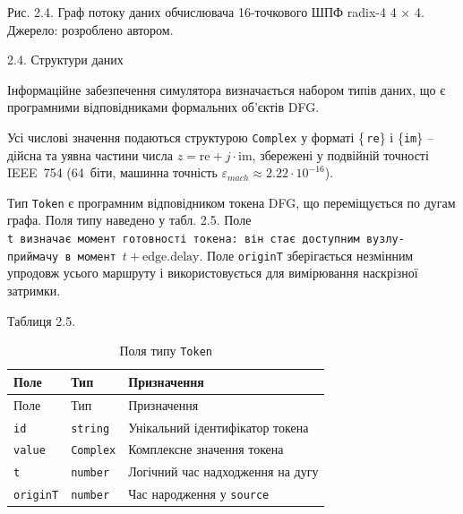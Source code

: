 \documentclass[
]{article}
\begin{document}
Рис. 2.4. Граф потоку даних обчислювача 16-точкового ШПФ radix-4 4 × 4.
Джерело: розроблено автором.

\protect{}\label{_Toc228121462}{}2.4. Структури даних

Інформаційне забезпечення симулятора визначається набором типів даних,
що є програмними відповідниками формальних об'єктів DFG.

Усі числові значення подаються структурою \texttt{Complex} у форматі
\{ \texttt{re}\} і \{\texttt{im}\} -- дійсна та уявна частини числа
\(z = \text{re} + j \cdot \text{im}\), збережені у подвійній точності
IEEE~754 (64~біти, машинна точність
\(\varepsilon_{mach} \approx 2.22 \cdot 10^{- 16}\)).

Тип \texttt{Token} є програмним відповідником токена DFG, що
переміщується по дугам графа. Поля типу наведено у табл. 2.5. Поле
\texttt{t\ }\texttt{визначає\ момент\ готовності\ токена:\ він\ стає\ доступним\ вузлу-приймачу\ в\ момент\ }\(t + \text{edge.delay}\).
Поле \texttt{originT} зберігається незмінним упродовж усього маршруту і
використовується для вимірювання наскрізної затримки.

Таблиця 2.5.

\begin{longtable}[]{@{}
  >{\raggedright\arraybackslash}p{}
  >{\raggedright\arraybackslash}p{}
  >{\raggedright\arraybackslash}p{}@{}}
\caption{Поля типу \protect\texttt{Token}}\tabularnewline
\toprule\noalign{}
\begin{minipage}[b]{\linewidth}\raggedright
Поле
\end{minipage} & \begin{minipage}[b]{\linewidth}\raggedright
Тип
\end{minipage} & \begin{minipage}[b]{\linewidth}\raggedright
Призначення
\end{minipage} \\
\midrule\noalign{}
\endfirsthead
\toprule\noalign{}
\begin{minipage}[b]{\linewidth}\raggedright
Поле
\end{minipage} & \begin{minipage}[b]{\linewidth}\raggedright
Тип
\end{minipage} & \begin{minipage}[b]{\linewidth}\raggedright
Призначення
\end{minipage} \\
\midrule\noalign{}
\endhead
\bottomrule\noalign{}
\endlastfoot
\texttt{id} & \texttt{string} & Унікальний ідентифікатор токена \\
\texttt{value} & \texttt{Complex} & Комплексне значення токена \\
\texttt{t} & \texttt{number} & Логічний час надходження на дугу \\
\texttt{originT} & \texttt{number} & Час народження у \texttt{source} \\
\end{longtable}
\end{document}

